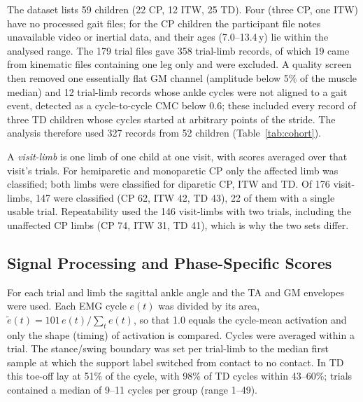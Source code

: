 \documentclass[conference]{IEEEtran}
\newcommand{\rone}[1]{{\color{rI}#1}}
\newcommand{\rtwo}[1]{{\color{rII}#1}}
\newcommand{\rthree}[1]{{\color{rIII}#1}}
\newcommand{\rfour}[1]{{\color{rIV}#1}}
\newcommand{\rone}[1]{#1}
\newcommand{\rtwo}[1]{#1}
\newcommand{\rthree}[1]{#1}
\newcommand{\rfour}[1]{#1}
\begin{document}
\rfour{The dataset lists 59 children (22 CP, 12 ITW, 25 TD). Four (three CP, one ITW) have no processed gait files; for the CP children the participant file notes unavailable video or inertial data, and their ages (7.0--13.4\,y) lie within the analysed range. The 179 trial files gave 358 trial-limb records, of which 19 came from kinematic files containing one leg only and were excluded.} \rone{A quality screen then removed one essentially flat GM channel (amplitude below 5\% of the muscle median) and 12 trial-limb records whose ankle cycles were not aligned to a gait event, detected as a cycle-to-cycle CMC below 0.6; these included every record of three TD children whose cycles started at arbitrary points of the stride.} \rtwo{The analysis therefore used 327 records from 52 children (Table~\ref{tab:cohort}).}

\rtwo{A \emph{visit-limb} is one limb of one child at one visit, with scores averaged over that visit's trials.} For hemiparetic and monoparetic CP only the affected limb was classified; both limbs were classified for diparetic CP, ITW and TD. \rthree{Of 176 visit-limbs, 147 were classified (CP 62, ITW 42, TD 43), 22 of them with a single usable trial. Repeatability used the 146 visit-limbs with two trials, including the unaffected CP limbs (CP 74, ITW 31, TD 41), which is why the two sets differ.}

\begin{table}[t]
\centering
\caption{\rtwo{Analysed cohort. Age at the first analysed visit. $^a$One TD child has no participant record}}
\label{tab:cohort}
\footnotesize
\setlength{\tabcolsep}{4pt}
\rtwo{}
\end{table}

\subsection{Signal Processing and Phase-Specific Scores}
For each trial and limb the sagittal ankle angle and the TA and GM envelopes were used. Each EMG cycle $e(t)$ was divided by its area, $\tilde e(t)=101\,e(t)/\sum_t e(t)$, so that 1.0 equals the cycle-mean activation and only the shape (timing) of activation is compared. Cycles were averaged within a trial. The stance/swing boundary was set per trial-limb to the median first sample at which the support label switched from contact to no contact. \rtwo{In TD this toe-off lay at 51\% of the cycle, with 98\% of TD cycles within 43--60\%; trials contained a median of 9--11 cycles per group (range 1--49).}
\end{document}
